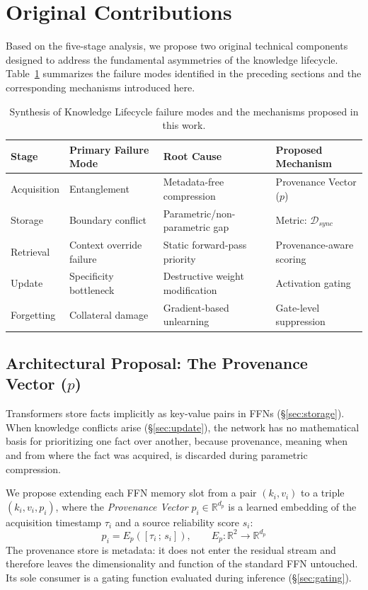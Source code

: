 \documentclass{article}
\begin{document}
\section{Original Contributions}
\label{sec:contributions}

Based on the five-stage analysis, we propose two original technical components designed to address the fundamental asymmetries of the knowledge lifecycle. Table~\ref{tab:synthesis} summarizes the failure modes identified in the preceding sections and the corresponding mechanisms introduced here.

\begin{table}[h]
\centering
\caption{Synthesis of Knowledge Lifecycle failure modes and the mechanisms proposed in this work.}
\label{tab:synthesis}
\small
\begin{tabular}{@{}llll@{}}
\toprule
\textbf{Stage} & \textbf{Primary Failure Mode} & \textbf{Root Cause} & \textbf{Proposed Mechanism} \\ \midrule
Acquisition & Entanglement & Metadata-free compression & Provenance Vector ($p$) \\
Storage & Boundary conflict & Parametric/non-parametric gap & Metric: $\mathcal{D}_{sync}$ \\
Retrieval & Context override failure & Static forward-pass priority & Provenance-aware scoring \\
Update & Specificity bottleneck & Destructive weight modification & Activation gating \\
Forgetting & Collateral damage & Gradient-based unlearning & Gate-level suppression \\ \bottomrule
\end{tabular}
\end{table}

\subsection{Architectural Proposal: The Provenance Vector ($p$)}
\label{sec:provenance}

Transformers store facts implicitly as key-value pairs in FFNs (\S\ref{sec:storage}). When knowledge conflicts arise (\S\ref{sec:update}), the network has no mathematical basis for prioritizing one fact over another, because provenance, meaning when and from where the fact was acquired, is discarded during parametric compression.

We propose extending each FFN memory slot from a pair $(k_i, v_i)$ to a triple $(k_i, v_i, p_i)$, where the \textit{Provenance Vector} $p_i \in \mathbb{R}^{d_p}$ is a learned embedding of the acquisition timestamp $\tau_i$ and a source reliability score $s_i$:
\begin{equation}
  p_i = E_p([\tau_i \,;\, s_i]), \qquad E_p : \mathbb{R}^2 \to \mathbb{R}^{d_p}
\end{equation}
The provenance store is metadata: it does not enter the residual stream and therefore leaves the dimensionality and function of the standard FFN untouched. Its sole consumer is a gating function evaluated during inference (\S\ref{sec:gating}).
\end{document}
